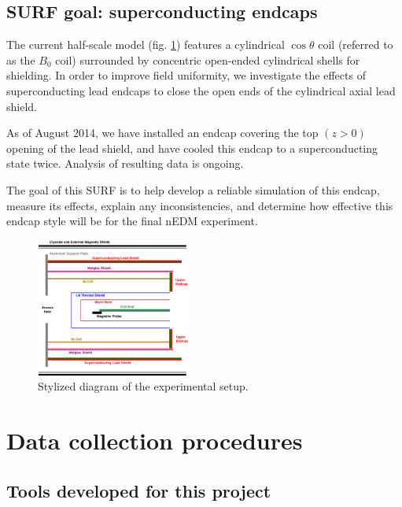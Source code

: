 \documentclass[twocolumn,aps,prb,citeautoscript]{revtex4-1}
\begin{document}
\subsection{SURF goal: superconducting endcaps}

The current half-scale model (fig. \ref{fig:structure})
features a cylindrical $\cos\theta$ coil \cite{coil} (referred to as the $B_0$ coil)
surrounded by concentric open-ended cylindrical shells for shielding.
In order to improve field uniformity, we investigate the effects of superconducting
lead endcaps to close the open ends of the cylindrical axial lead shield.


As of August 2014, we have installed an endcap covering the top $(z>0)$ opening
of the lead shield, and have cooled this
endcap to a superconducting state twice. Analysis of resulting data is ongoing.

The goal of this SURF is to help develop a reliable simulation of
this endcap, measure its effects, explain any inconsistencies, and determine how effective
this endcap style will be for the final nEDM experiment.

\begin{figure}
\includegraphics[angle=90, width=0.45\textwidth]{figures/structure.eps}
\caption{\label{fig:structure}Stylized diagram of the experimental
setup.}
\end{figure}

\section{Data collection procedures}

\subsection{Tools developed for this project}
\end{document}
